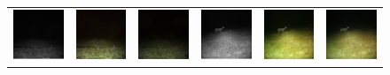 \begin{figure}[htp!]
\begin{tabularx}{\textwidth}{Y Y Y !{\space} Y Y Y}
        \includegraphics{gfx/diffusion-sampling-loss-guided-vs-correction-guided-qual/nir_S2_B06_R3_PICT3848.jpg} & \includegraphics{gfx/diffusion-sampling-loss-guided-vs-correction-guided-qual/diffusion-correction-guided_S2_B06_R3_PICT3848.png} & \includegraphics{gfx/diffusion-sampling-loss-guided-vs-correction-guided-qual/diffusion-loss-guided_S2_B06_R3_PICT3848.png} & \includegraphics{gfx/diffusion-sampling-loss-guided-vs-correction-guided-qual/nir_S2_B07_R1_PICT3274.jpg} & \includegraphics{gfx/diffusion-sampling-loss-guided-vs-correction-guided-qual/diffusion-correction-guided_S2_B07_R1_PICT3274.png} & \includegraphics{gfx/diffusion-sampling-loss-guided-vs-correction-guided-qual/diffusion-loss-guided_S2_B07_R1_PICT3274.png}

\end{tabularx}
\end{figure}
